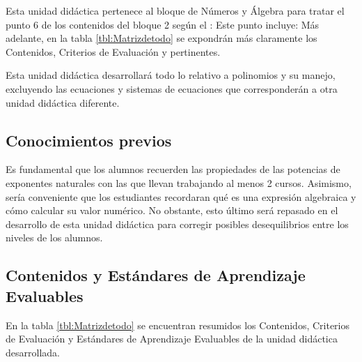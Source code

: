 Esta unidad didáctica pertenece al bloque de Números y Álgebra para tratar el punto 6 de los contenidos del bloque 2 según el \bocm: 
%
Este punto incluye:
%
%
Más adelante, en la tabla \ref{tbl:Matrizdetodo} se expondrán más claramente los Contenidos, Criterios de Evaluación y \eaes pertinentes.

Esta unidad didáctica desarrollará todo lo relativo a polinomios y su manejo, excluyendo las ecuaciones y sistemas de ecuaciones que corresponderán a otra unidad didáctica diferente.

\subsection{Conocimientos previos}

Es fundamental que los alumnos recuerden las propiedades de las potencias de exponentes naturales con las que llevan trabajando al menos 2 cursos.
%
Asimismo, sería conveniente que los estudiantes recordaran qué es una expresión algebraica y cómo calcular su valor numérico.
%
No obstante, esto último será repasado en el desarrollo de esta unidad didáctica para corregir posibles desequilibrios entre los niveles de los alumnos.



\subsection{Contenidos y Estándares de Aprendizaje Evaluables}

En la tabla \ref{tbl:Matrizdetodo} se encuentran resumidos los Contenidos, Criterios de Evaluación y  Estándares de Aprendizaje Evaluables de la unidad didáctica desarrollada.

